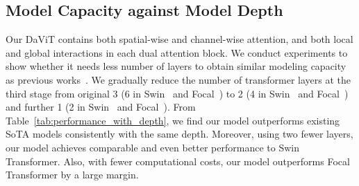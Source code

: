 \documentclass[runningheads]{llncs}
\newcommand{\model}{DaViT\xspace}
\begin{document}
\subsection{Model Capacity against Model Depth}
Our \model contains both spatial-wise and channel-wise attention, and both local and global interactions in each dual attention block. We conduct experiments to show whether it needs less number of layers to obtain similar modeling capacity as previous works~\cite{liu2021swin,yang2021focal}.
We gradually reduce the number of transformer layers at the third stage from original 3 (6 in Swin~\cite{liu2021swin} and Focal~\cite{yang2021focal}) to 2 (4 in Swin~\cite{liu2021swin} and Focal~\cite{yang2021focal}) and further 1 (2 in Swin~\cite{liu2021swin} and Focal~\cite{yang2021focal}).
From Table~\ref{tab:performance_with_depth}, we find our model outperforms existing SoTA models consistently with the same depth. Moreover, using two fewer layers, our model achieves comparable and even better performance to Swin Transformer. Also, with fewer computational costs, our model outperforms Focal Transformer by a large margin.
\end{document}
